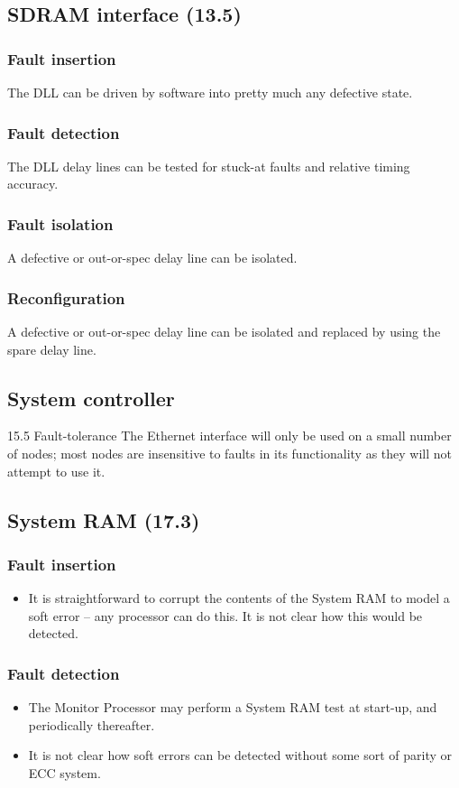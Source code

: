 \documentclass[11pt]{article}
\newenvironment{itmz}{
	\begin{itemize}
		\setlength{\itemsep}{0pt}
		\setlength{\parskip}{0pt}
	}{\end{itemize}}
\begin{document}
\subsection{SDRAM interface (13.5)}
\subsubsection*{Fault insertion}
The DLL can be driven by software into pretty much any defective state.
\subsubsection*{Fault detection}
The DLL delay lines can be tested for stuck-at faults and relative timing accuracy.
\subsubsection*{Fault isolation}
A defective or out-or-spec delay line can be isolated.
\subsubsection*{Reconfiguration}
A defective or out-or-spec delay line can be isolated and replaced by using the spare delay line.

\subsection{System controller}
15.5 Fault-tolerance
The Ethernet interface will only be used on a small number of nodes; most nodes are insensitive to
faults in its functionality as they will not attempt to use it.

\subsection{System RAM (17.3)}
\subsubsection*{Fault insertion}
\begin{itmz}
\item It is straightforward to corrupt the contents of the System RAM to model a soft error -- any processor can do this. It is not clear how this would be detected.
\end{itmz}
\subsubsection*{Fault detection}
\begin{itmz}
\item The Monitor Processor may perform a System RAM test at start-up, and periodically thereafter.
\item It is not clear how soft errors can be detected without some sort of parity or ECC system.
\end{itmz}
\end{document}
